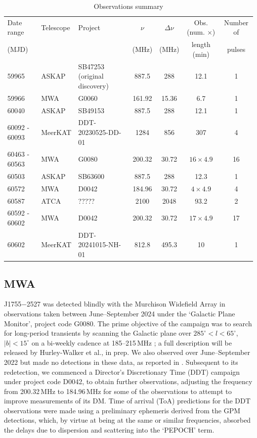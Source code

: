 \documentclass[fleqn,usenatbib]{mnras}
\newcommand{\todo}[1]{{\color{red}#1}}
\newcommand{\src}{J1755$-$2527}
\begin{document}
\begin{table}
  \centering
  \caption{Observations summary}
  \label{tbl:obs}
  \begin{tabular}{lllcccc}
    \hline
    Date range & Telescope & Project & $\nu$ & $\Delta\nu$ & Obs. (num. $\times$) & Number of \\ 
    (MJD) & & & (MHz) & (MHz) & length (min) & pulses \\
    \hline 
    59965 & ASKAP & SB47253 (original discovery) & 887.5 & 288 & 12.1 & 1 \\
    59966 & MWA & G0060 & 161.92 & 15.36 & 6.7 & 1 \\
    60040  & ASKAP & SB49153 & 887.5 & 288 & 12.1 & 1 \\
    60092 - 60093 & MeerKAT & DDT-20230525-DD-01 & 1284 & 856 & 307 & 4 \\
    60463 - 60563 & MWA & G0080 & 200.32 & 30.72 & $16 \times 4.9$ & 16 \\
    60503 & ASKAP & SB63600 & 887.5 & 288 & 12.3 & 1 \\
    60572 & MWA & D0042 & 184.96 & 30.72 & $4 \times 4.9$ & 4 \\
    60587 & ATCA & \todo{?????} & 2100 & 2048 & 93.2 & 2 \\
    60592 - 60602 & MWA & D0042 & 200.32 & 30.72 & $17 \times 4.9$ & 17 \\
    60602 & MeerKAT & DDT-20241015-NH-01 & 812.8 & 495.3 & 10 & 1 \\
    \hline
  \end{tabular}
\end{table}

\subsection{MWA} \label{sec:mwa}

\src{} was detected blindly with the Murchison Widefield Array \citep[MWA;][]{Tingay2013} in observations taken between June--September 2024 under the `Galactic Plane Monitor', project code G0080. The prime objective of the campaign was to search for long-period transients by scanning the Galactic plane over $285^\circ < l < 65^\circ$, $|b| < 15^\circ$ on a bi-weekly cadence at 185--215\,MHz \citep[see Methods of][]{2023Natur.619..487H}; a full description will be released by Hurley-Walker et al., in prep. We also observed over June--September 2022 but made no detections in these data, as reported in .
Subsequent to its redetection, we commenced a Director's Discretionary Time (DDT) campaign under project code D0042, to obtain further observations, adjusting the frequency from 200.32\,MHz to 184.96\,MHz for some of the observations to attempt to improve measurements of its DM.
Time of arrival (ToA) predictions for the DDT observations were made using a preliminary ephemeris derived from the GPM detections, which, by virtue at being at the same or similar frequencies, absorbed the delays due to dispersion and scattering into the `PEPOCH' term.
\end{document}
